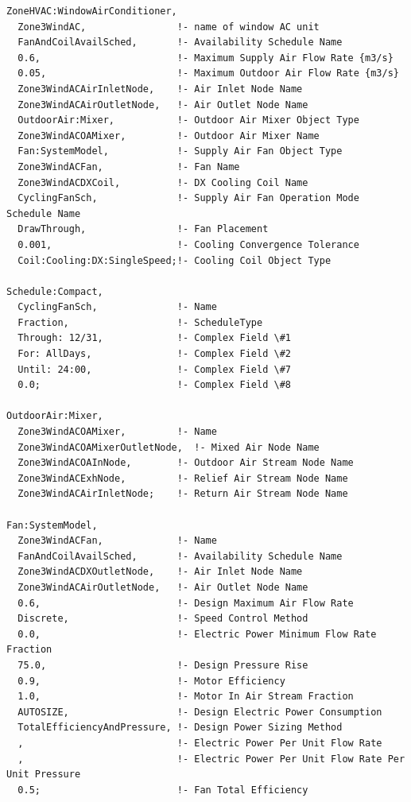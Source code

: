 \begin{lstlisting}
ZoneHVAC:WindowAirConditioner,
  Zone3WindAC,                !- name of window AC unit
  FanAndCoilAvailSched,       !- Availability Schedule Name
  0.6,                        !- Maximum Supply Air Flow Rate {m3/s}
  0.05,                       !- Maximum Outdoor Air Flow Rate {m3/s}
  Zone3WindACAirInletNode,    !- Air Inlet Node Name
  Zone3WindACAirOutletNode,   !- Air Outlet Node Name
  OutdoorAir:Mixer,           !- Outdoor Air Mixer Object Type
  Zone3WindACOAMixer,         !- Outdoor Air Mixer Name
  Fan:SystemModel,            !- Supply Air Fan Object Type
  Zone3WindACFan,             !- Fan Name
  Zone3WindACDXCoil,          !- DX Cooling Coil Name
  CyclingFanSch,              !- Supply Air Fan Operation Mode Schedule Name
  DrawThrough,                !- Fan Placement
  0.001,                      !- Cooling Convergence Tolerance
  Coil:Cooling:DX:SingleSpeed;!- Cooling Coil Object Type

Schedule:Compact,
  CyclingFanSch,              !- Name
  Fraction,                   !- ScheduleType
  Through: 12/31,             !- Complex Field \#1
  For: AllDays,               !- Complex Field \#2
  Until: 24:00,               !- Complex Field \#7
  0.0;                        !- Complex Field \#8

OutdoorAir:Mixer,
  Zone3WindACOAMixer,         !- Name
  Zone3WindACOAMixerOutletNode,  !- Mixed Air Node Name
  Zone3WindACOAInNode,        !- Outdoor Air Stream Node Name
  Zone3WindACExhNode,         !- Relief Air Stream Node Name
  Zone3WindACAirInletNode;    !- Return Air Stream Node Name

Fan:SystemModel,
  Zone3WindACFan,             !- Name
  FanAndCoilAvailSched,       !- Availability Schedule Name
  Zone3WindACDXOutletNode,    !- Air Inlet Node Name
  Zone3WindACAirOutletNode,   !- Air Outlet Node Name
  0.6,                        !- Design Maximum Air Flow Rate
  Discrete,                   !- Speed Control Method
  0.0,                        !- Electric Power Minimum Flow Rate Fraction
  75.0,                       !- Design Pressure Rise
  0.9,                        !- Motor Efficiency
  1.0,                        !- Motor In Air Stream Fraction
  AUTOSIZE,                   !- Design Electric Power Consumption
  TotalEfficiencyAndPressure, !- Design Power Sizing Method
  ,                           !- Electric Power Per Unit Flow Rate
  ,                           !- Electric Power Per Unit Flow Rate Per Unit Pressure
  0.5;                        !- Fan Total Efficiency


\end{lstlisting}

